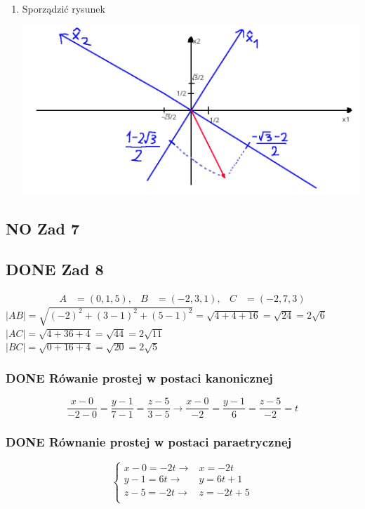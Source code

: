 \documentclass[11pt]{article}
\begin{document}
\begin{enumerate}
\item Sporządzić rysunek
\label{sec:org2cb7a42}
\begin{center}
\includegraphics[width=.9\linewidth]{img/zad6.jpg}
\end{center}
\end{enumerate}
\subsection{{\bfseries\sffamily NO} Zad 7}
\label{sec:org6e951d3}
\subsection{{\bfseries\sffamily DONE} Zad 8}
\label{sec:org9f01292}
\begin{align*}
A&=(0,1,5),& B&=(-2,3,1),& C&=(-2, 7,3)
\end{align*}
\(|AB| = \sqrt{(-2)^{2} + (3-1)^{2} + (5 -1)^{2}} = \sqrt{4 + 4 +16} = \sqrt{24} = 2\sqrt{6}\)
\\\empty
\(|AC| = \sqrt{ 4 + 36 + 4} = \sqrt{44} = 2 \sqrt{11}\)
\\\empty
\(|BC| = \sqrt{0 + 16 + 4} = \sqrt{20} = 2\sqrt{5}\)
\subsubsection{{\bfseries\sffamily DONE} Rówanie prostej w postaci kanonicznej}
\label{sec:org94c48dd}
$$\frac{x - 0}{-2 - 0} = \frac{y - 1}{7 - 1} = \frac{z - 5}{3 -5}
\to \frac{x - 0}{-2} = \frac{y - 1}{6} = \frac{z - 5}{-2}
= t$$
\subsubsection{{\bfseries\sffamily DONE} Równanie prostej w postaci paraetrycznej}
\label{sec:org319e9e1}
\[\begin{cases}
x-0 = -2t \to & x = -2t\\
y - 1 = 6t \to & y = 6t +1\\
z -5 = -2t \to & z = -2t + 5\\
\end{cases}\]
\end{document}
